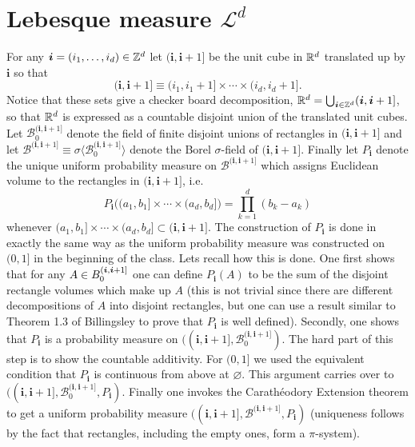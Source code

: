 \documentclass[10pt,letterpaper,twocolumn]{article}
\newcommand{\bs}{\boldsymbol}
\begin{document}


\section{Lebesque measure $\mathcal L^d$}


For any $\bs i=(i_1,\ldots, i_d)\in\Bbb Z^d$ let $(\bs i,\bs i+1]$ be the unit cube in $\Bbb R^d$ translated up by $\bs i$ so that
\[(\bs i,\bs i+1] \equiv (i_1, i_1+1]\times \cdots \times (i_d,i_d + 1].  \]
Notice that these sets give a checker board decomposition, $\Bbb R^d=\bigcup_{\bs i\in\Bbb Z^d} (\bs i,\bs i+1] $, so that $\Bbb R^d$ is expressed as a countable disjoint union of the translated unit cubes. Let $\mathcal B_{0}^{(\bs i,\bs i+1] }$ denote the field of finite disjoint unions of rectangles in $(\bs i,\bs i+1] $ and let $\mathcal B^{(\bs i,\bs i+1] }\equiv \sigma \langle \mathcal B_{0}^{(\bs i,\bs i+1] }\rangle $ denote the Borel $\sigma$-field of  $(\bs i,\bs i+1]$. Finally let $P_{\bs i}$ denote the unique uniform probability measure on $\mathcal B^{(\bs i,\bs i+1] }$ which assigns Euclidean volume  to the rectangles in  $(\bs i,\bs i+1] $, i.e.
\[ P_{\bs i}\bigl( (a_1,b_1]\times \cdots \times (a_d,b_d]\bigr)=\prod_{k=1}^d (b_k - a_k) \]
whenever $(a_1,b_1]\times \cdots \times (a_d,b_d]\subset (\bs i,\bs i+1]$. The construction of $P_{\bs i}$ is done in exactly the same way as the uniform probability measure was constructed on $(0,1]$ in the beginning of the class. Lets recall how this is done. One first shows that for any $A\in \mathcal \mathcal B_{0}^{(\bs i,\bs i+1] }$ one can define $P_{\bs i}(A)$ to be the sum  of the disjoint rectangle volumes which make up $A$ (this is not trivial since there are different decompositions of $A$ into disjoint rectangles, but one can use a result similar to Theorem 1.3 of Billingsley to prove that $P_{\bs i}$ is well defined).  Secondly, one shows that $P_{\bs i}$ is a probability measure on $((\bs i, \bs i +1],\mathcal B_{0}^{(\bs i,\bs i+1] })$. The hard part of this step is to  show the countable additivity. For $(0,1]$ we used the equivalent condition that  $P_{\bs i}$ is continuous from above at $\varnothing$. This argument carries over to $((\bs i, \bs i +1],\mathcal B_{0}^{(\bs i,\bs i+1] }, P_{\bs i})$. Finally one invokes the Carath\'eodory Extension theorem to get a uniform probability measure $((\bs i, \bs i +1],\mathcal B^{(\bs i,\bs i+1] }, P_{\bs i})$ (uniqueness follows by the fact that rectangles, including the empty ones, form a $\pi$-system).
\end{document}
